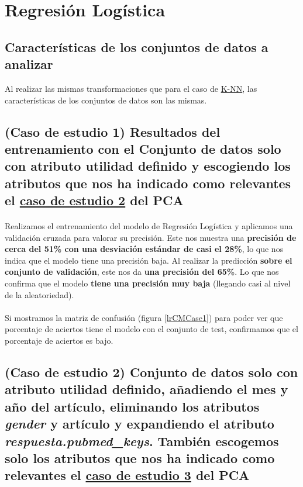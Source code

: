 \section{Regresión Logística}
\label{resultados:lr}

\subsection{Características de los conjuntos de datos a analizar}
\label{resultados:lr_caracteristicas}
Al realizar las mismas transformaciones que para el caso de \hyperref[resultados:knn_caracteristicas]{K-NN}, las características de los conjuntos de datos son las mismas.

\subsection{(Caso de estudio 1) Resultados del entrenamiento con el Conjunto de datos solo con atributo utilidad definido y escogiendo los atributos que nos ha indicado como relevantes el \hyperref[result:pca_case2]{caso de estudio 2} del PCA}

\paragraph{}
Realizamos el entrenamiento del modelo de Regresión Logística\cite{ref:lr_def} y aplicamos una validación cruzada\cite{ref:lr_cross_validation} para valorar su precisión. Este nos muestra una \textbf{precisión de cerca del 51\% con una desviación estándar de casi el 28\%}, lo que nos indica que el modelo tiene una precisión baja. Al realizar la predicción \textbf{sobre el conjunto de validación}, este nos da \textbf{una precisión del 65\%}. Lo que nos confirma que el modelo \textbf{tiene una precisión muy baja} (llegando casi al nivel de la aleatoriedad).

\paragraph{}
Si mostramos la matriz de confusión\cite{ref:confusion_matrix} (figura \ref{lrCMCase1}) para poder ver que porcentaje de aciertos tiene el modelo con el conjunto de test, confirmamos que el porcentaje de aciertos es bajo.

\subsection{(Caso de estudio 2) Conjunto de datos solo con atributo utilidad definido, añadiendo el mes y año del artículo, eliminando los atributos \textit{gender} y artículo y expandiendo el atributo \textit{respuesta.pubmed\_keys}. También escogemos solo los atributos que nos ha indicado como relevantes el \hyperref[result:pca_case3]{caso de estudio 3} del PCA}

